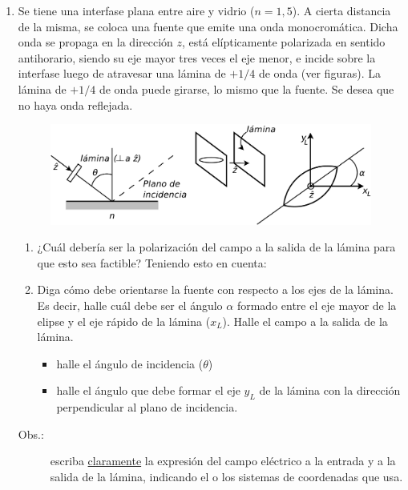 \documentclass[11pt,spanish,a4paper]{article}
\begin{document}
\begin{enumerate}
\item Se tiene una interfase plana entre aire y vidrio ($n=1,5$). A cierta
distancia de la misma, se coloca una fuente que emite una onda monocromática.
Dicha onda se propaga en la dirección $z$, está elípticamente polarizada
en sentido antihorario, siendo su eje mayor tres veces el eje menor,
e incide sobre la interfase luego de atravesar una lámina de $+1/4$
de onda (ver figuras). La lámina de $+1/4$ de onda puede girarse,
lo mismo que la fuente. Se desea que no haya onda reflejada.
\begin{figure}[H]
\centering{}\includegraphics[clip,scale=0.25]{ej4-28}
\end{figure}
\begin{enumerate}
\item ¿Cuál debería ser la polarización del campo a la salida de la lámina
para que esto sea factible? Teniendo esto en cuenta:
\item Diga cómo debe orientarse la fuente con respecto a los ejes de la
lámina. Es decir, halle cuál debe ser el ángulo $\alpha$ formado
entre el eje mayor de la elipse y el eje rápido de la lámina ($x_{L}$).
Halle el campo a la salida de la lámina.
\begin{itemize}
\item halle el ángulo de incidencia ($\theta$)
\item halle el ángulo que debe formar el eje $y_{L}$ de la lámina con la
dirección perpendicular al plano de incidencia. 
\end{itemize}
\end{enumerate}
\begin{description}
\item [{Obs.:}] escriba \underline{claramente} la expresión del campo eléctrico
a la entrada y a la salida de la lámina, indicando el o los sistemas
de coordenadas que usa. \end{description}
\end{enumerate}
\end{document}
